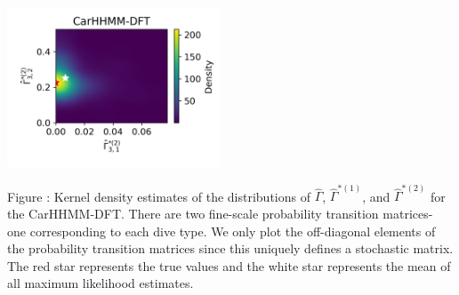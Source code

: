 \documentclass{article}
\begin{document}
\begin{center}
        \includegraphics[width=2.5in]{../Plots/hhmm_FV_Gamma_density_1_row_2.png}
        \end{center}
        
        \noindent Figure : Kernel density estimates of the distributions of $\hat \Gamma$, $\hat \Gamma^{*(1)}$, and $\hat \Gamma^{*(2)}$ for the CarHHMM-DFT. There are two fine-scale probability transition matrices- one corresponding to each dive type. We only plot the off-diagonal elements of the probability transition matrices since this uniquely defines a stochastic matrix. The red star represents the true values and the white star represents the mean of all maximum likelihood estimates.
        \addtocounter{fignum}{1}
        
        \newpage
\end{document}

